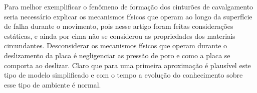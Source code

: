\documentclass[manuscript]{geophysics}[10pt]
\begin{document}
Para melhor exemplificar o fenômeno de formação dos cinturões de cavalgamento seria necessário explicar os mecanismos físicos que operam ao longo da superfície de falha durante o movimento, pois nesse artigo foram feitas considerações estáticas, e ainda por cima não se considerou as propriedades dos materiais circundantes. Desconsiderar os mecanismos físicos que operam durante o deslizamento da placa é negligenciar as pressão de poro e como a placa se comporta ao deslizar. Claro que para uma primeira aproximação é plausível este tipo de modelo simplificado e com o tempo a evolução do conhecimento sobre esse tipo de ambiente é normal.



    
\end{document}
